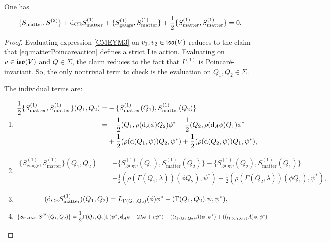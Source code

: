 \documentclass[10pt, oneside]{article}
\newcommand{\gauge}{\mathrm{gauge}}
\newcommand{\matter}{\mathrm{matter}}
\begin{document}
\begin{lemma} 
One has
\begin{equation}\label{CMEYM3}
\{S_{\matter}, S^{(2)}\} + \d_{\mr{CE}} S_{\matter}^{(1)} + \{S_{\gauge}^{(1)}, S_{\matter}^{(1)}\} + \frac{1}{2} \{S_{\matter}^{(1)}, S_{\matter}^{(1)}\} = 0 .
\end{equation}
\end{lemma}
\begin{proof}
Evaluating expression \eqref{CMEYM3} on $v_1,v_2 \in \mathfrak{iso}(V)$ reduces to the claim that \eqref{eq:matterPoincareaction} defines a strict Lie action. Evaluating on $v \in \mathfrak{iso}(V)$ and $Q \in \Sigma$, the claim reduces to the fact that $I^{(1)}$ is Poincar\'{e}-invariant. So, the only nontrivial term to check is the evaluation on $Q_1,Q_2 \in \Sigma$. 

The individual terms are:
\begin{enumerate}
\item \begin{align*}
\frac{1}{2}\{S_{\matter}^{(1)}, S_{\matter}^{(1)}\}(Q_1, Q_2) =& -\{S_{\matter}^{(1)}(Q_1), S_{\matter}^{(1)}(Q_2)\} \\
=&-\frac{1}{2}(Q_1, \rho(\d_A \phi) Q_2)\phi^* - \frac{1}{2}(Q_2, \rho(\d_A \phi)Q_1)\phi^* \\ &  +\frac{1}{2}(\rho(\d(Q_1,\psi))Q_2, \psi^*) +\frac{1}{2} (\rho(\d(Q_2, \psi)) Q_1, \psi^*),
\end{align*}

\item \begin{align*}
\{S_{\gauge}^{(1)}, S_{\matter}^{(1)}\}(Q_1, Q_2) = &-\{S_{\gauge}^{(1)}(Q_1), S_{\matter}^{(1)}(Q_2)\} - \{S_{\gauge}^{(1)}(Q_2), S_{\matter}^{(1)}(Q_1)\} \\
=& -\frac{1}{2}(\rho(\Gamma(Q_1, \lambda))(\phi Q_2), \psi^*) - \frac{1}{2}(\rho(\Gamma(Q_2, \lambda))(\phi Q_1), \psi^*),
\end{align*}

\item
\[
(\d_{\mr{CE}}S_{\matter}^{(1)})(Q_1,Q_2) = L_{\Gamma(Q_1,Q_2)} (\phi)\phi^* - (\Gamma(Q_1,Q_2).\psi, \psi^*),
\]

\item
\[
\{S_{\matter}, S^{(2)}(Q_1,Q_2)\} =  \frac{1}{2} \Gamma(Q_1,Q_2) \Gamma(\psi^*, \sd \d_A \psi - 2 \lambda\phi + c\psi^*) - ((\iota_{\Gamma(Q_1, Q_2)} A)\psi, \psi^*) + ((\iota_{\Gamma(Q_1, Q_2)} A)\phi, \phi^*)
\]
\end{enumerate}


\end{proof}
\end{document}
